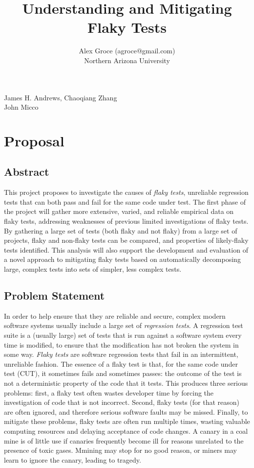 \documentclass[10pt]{article}
\title{Understanding and Mitigating Flaky Tests}
\author{Alex Groce (agroce@gmail.com)\\Northern Arizona University}
\date{}
\begin{document}
\maketitle


 James H. Andrews, Chaoqiang Zhang \\
 John Micco
\section{Proposal}

\subsection{Abstract}

This project proposes to investigate the causes of \emph{flaky tests}, unreliable regression tests that can both pass and fail for the same code under test.  The first phase of the project will gather more extensive, varied, and reliable empirical data on flaky tests, addressing weaknesses of previous limited investigations of flaky tests.  By gathering a large set of tests (both flaky and not flaky) from a large set of projects, flaky and non-flaky tests can be compared, and properties of likely-flaky tests identified.  This analysis will also support the development and evaluation of a novel approach to mitigating flaky tests based on automatically decomposing large, complex tests into sets of simpler, less complex tests.

\subsection{Problem Statement}

In order to help ensure that they are reliable and secure, complex modern software systems usually include a large set of \emph{regression tests}.  A regression test suite is a (usually large) set of tests that is run against a software system every time is modified, to ensure that the modification has not broken the system in some way.
\emph{Flaky tests} \cite{miccoflaky} are software regression tests that fail in an intermittent, unreliable fashion.  The essence of a flaky test is that, for the same code under test (CUT), it sometimes fails and sometimes passes:  the outcome of the test is not a deterministic property of the code that it tests.  This produces three serious problems:  first, a flaky test often wastes developer time by forcing the investigation of code that is not incorrect.  Second, flaky tests (for that reason) are often ignored, and therefore serious software faults may be missed.  Finally, to mitigate these problems, flaky tests are often run multiple times, wasting valuable computing resources and delaying acceptance of code changes.  A canary in a coal mine is of little use if canaries frequently become ill for reasons unrelated to the presence of toxic gases.  Mmining may stop for no good reason, or miners may learn to ignore the canary, leading to tragedy.
\end{document}
